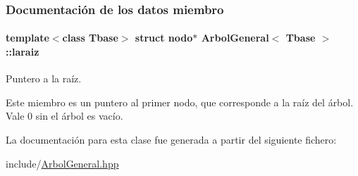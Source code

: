\subsubsection{Documentación de los datos miembro}
\hypertarget{classArbolGeneral_a14a859dc79b8df4d5a77b5c871713c9e}{
\paragraph[{laraiz}]{\setlength{\rightskip}{0pt plus 5cm}template$<$class Tbase$>$ struct {\bf nodo}$\ast$ {\bf Arbol\-General}$<$ Tbase $>$\-::laraiz\hspace{0.3cm}{\ttfamily [private]}}}\label{classArbolGeneral_a14a859dc79b8df4d5a77b5c871713c9e}


Puntero a la raíz. 

Este miembro es un puntero al primer nodo, que corresponde a la raíz del árbol. Vale 0 sin el árbol es vacío. 

La documentación para esta clase fue generada a partir del siguiente fichero\-:\begin{DoxyCompactItemize}
\item 
include/\hyperlink{ArbolGeneral_8hpp}{Arbol\-General.\-hpp}\end{DoxyCompactItemize}

